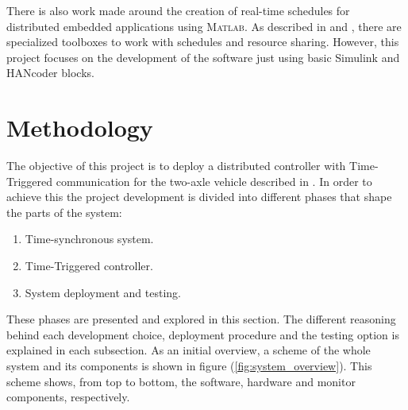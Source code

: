 \documentclass[table,xcdraw]{article}
\begin{document}
There is also work made around the creation of real-time schedules for distributed embedded applications using \textsc{Matlab}. As described in \citep{RTW_matlab} and \citep{TT_task_schedule_matlab}, there are specialized toolboxes to work with schedules and resource sharing. However, this project focuses on the development of the software just using basic Simulink and HANcoder blocks.\\




\newpage
\section{Methodology} \label{sec:methodology}
The objective of this project is to deploy a distributed controller with Time-Triggered communication for the two-axle vehicle described in \citep{two_axle_vehicle}. In order to achieve this the project development is divided into different phases that shape the parts of the system:
\begin{enumerate}
    \item Time-synchronous system.
    \item Time-Triggered controller.
    \item System deployment and testing.
\end{enumerate}

These phases are presented and explored in this section. The different reasoning behind each development choice, deployment procedure and the testing option is explained in each subsection. As an initial overview, a scheme of the whole system and its components is shown in figure (\ref{fig:system_overview}). This scheme shows, from top to bottom, the software, hardware and monitor components, respectively.\\
\end{document}
